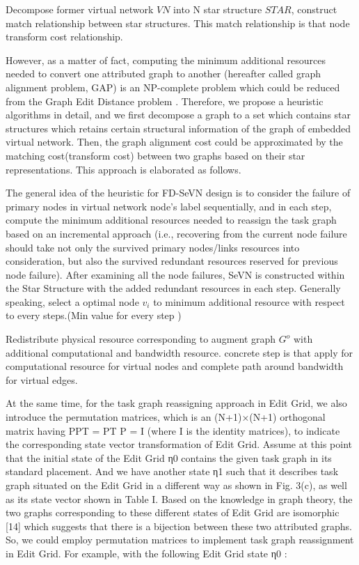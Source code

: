 Decompose former virtual network $VN$ into N star structure $STAR$, construct match relationship between star structures. This match relationship is that node transform cost relationship.

However, as a matter of fact, computing the minimum additional resources needed to convert one attributed graph to another (hereafter called graph alignment problem, GAP) is an NP-complete problem which could be reduced from the Graph Edit Distance problem \cite{justice2006binary}. Therefore, we propose a heuristic algorithms in detail, and we first decompose a graph to a set which contains star structures which retains certain structural information of the graph of embedded virtual network. Then, the graph alignment cost could be approximated by the matching cost(transform cost) between two graphs based on their star representations. This approach is elaborated as follows.


The general idea of the heuristic for FD-SeVN design is to consider the failure of primary nodes in virtual network node's label sequentially, and in each step, compute the minimum additional resources needed to reassign the task graph based on an incremental approach (i.e., recovering from the current node failure should take not only the survived primary nodes/links resources into consideration, but also the survived redundant resources reserved for previous node failure). After examining all the node failures, SeVN is constructed within the Star Structure with the added redundant resources in each step. Generally speaking, select a optimal node $v_i$ to minimum additional resource with respect to every steps.(Min value for every step )



Redistribute physical resource corresponding to augment graph $G^o$  with additional computational and bandwidth resource. concrete step is that apply for computational resource for virtual nodes and complete path around bandwidth for virtual edges.


At the same time, for the task graph reassigning approach in
Edit Grid, we also introduce the permutation matrices, which is
an (N+1)×(N+1) orthogonal matrix having PPT = PT P = I
(where I is the identity matrices), to indicate the corresponding
state vector transformation of Edit Grid. Assume at this point
that the initial state of the Edit Grid η0 contains the given task
graph in its standard placement. And we have another state η1
such that it describes task graph situated on the Edit Grid in a
different way as shown in Fig. 3(c), as well as its state vector
shown in Table I. Based on the knowledge in graph theory,
the two graphs corresponding to these different states of Edit
Grid are isomorphic [14] which suggests that there is a bijection
between these two attributed graphs. So, we could employ
permutation matrices to implement task graph reassignment in
Edit Grid. For example, with the following Edit Grid state η0 :

